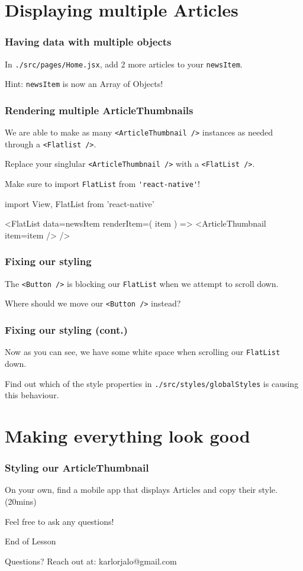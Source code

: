 \documentclass{beamer}
\begin{document}
  \section{Displaying multiple Articles}
  \begin{frame}[fragile]
    \frametitle{Having data with multiple objects}
    In \verb|./src/pages/Home.jsx|, add 2 more articles to your \verb|newsItem|.
    
    Hint: \verb|newsItem| is now an Array of Objects!
  \end{frame}
  \begin{frame}[fragile]
    \frametitle{Rendering multiple ArticleThumbnails}
    We are able to make as many \verb|<ArticleThumbnail />| instances as needed through a \verb|<Flatlist />|. 

    Replace your singlular \verb|<ArticleThumbnail />| with a \verb|<FlatList />|. 

    Make sure to import \verb|FlatList| from \verb|'react-native'|!

    \begin{jscodesmall}
import {View, FlatList} from 'react-native'

<FlatList
  data={newsItem}
  renderItem={({ item }) => <ArticleThumbnail item={item} />}
/>
    \end{jscodesmall}
  \end{frame}

  \begin{frame}[fragile]
    \frametitle{Fixing our styling}
    The \verb|<Button />| is blocking our \verb|FlatList| when we attempt to scroll down. 

    Where should we move our \verb|<Button />| instead? 
  \end{frame}
  \begin{frame}[fragile]
    \frametitle{Fixing our styling (cont.)}
    Now as you can see, we have some white space when scrolling our \verb|FlatList| down. 

    Find out which of the style properties in \verb|./src/styles/globalStyles| is causing this behaviour. 
  \end{frame}

  \section{Making everything look good}
  \begin{frame}[fragile]
    \frametitle{Styling our ArticleThumbnail}
    On your own, find a mobile app that displays Articles and copy their style. (20mins)

    Feel free to ask any questions!
  \end{frame}

  \appendix

  \begin{frame}[standout]
    End of Lesson

    {\small Questions? Reach out at:}
    {\footnotesize karlorjalo@gmail.com}
  \end{frame}
\end{document}
